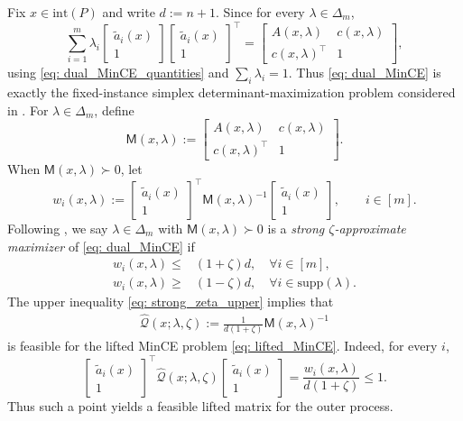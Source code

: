 \documentclass[smallextended]{svjour3}
\newcommand{\wh}{\widehat}
\begin{document}
Fix $x \in \mathrm{int}(P)$ and write $d:=n+1$. Since for every $\lambda\in \Delta_m$,
\[
    \sum_{i=1}^m \lambda_i
    \begin{bmatrix}
        \tilde a_i(x)\\1
    \end{bmatrix}
    \begin{bmatrix}
        \tilde a_i(x)\\1
    \end{bmatrix}^{\top}
    =
    \begin{bmatrix}
        A(x,\lambda) & c(x,\lambda) \\
        c(x,\lambda)^\top & 1
    \end{bmatrix},
\]
using \eqref{eq: dual_MinCE_quantities} and $\sum_i\lambda_i=1$.
Thus \eqref{eq: dual_MinCE} is exactly the fixed-instance simplex
determinant-maximization problem considered in \cite{ahipasaoglu2008fw}. For $\lambda\in \Delta_m$, define
\[
    \mathsf M(x,\lambda):=
    \begin{bmatrix}
        A(x,\lambda) & c(x,\lambda)\\
        c(x,\lambda)^\top & 1
    \end{bmatrix}.
\]
When $\mathsf M(x,\lambda)\succ0$, let
\[
    w_i(x,\lambda):=
    \begin{bmatrix}
        \tilde a_i(x)\\1
    \end{bmatrix}^{\top}
    \mathsf M(x,\lambda)^{-1}
    \begin{bmatrix}
        \tilde a_i(x)\\1
    \end{bmatrix},
    \qquad i\in[m].
\]
Following \cite{ahipasaoglu2008fw}, we say
$\lambda\in\Delta_m$ with $\mathsf M(x,\lambda)\succ0$ is a
\emph{strong $\zeta$-approximate maximizer} of \eqref{eq: dual_MinCE} if
\begin{subequations}
\begin{align}
    w_i(x,\lambda)\leq & (1+\zeta)d,\quad \forall i\in [m], \label{eq: strong_zeta_upper}\\
    w_i(x,\lambda)\geq & (1-\zeta)d,\quad \forall i\in \mathrm{supp}(\lambda). \label{eq: strong_zeta_lower}
\end{align}
\end{subequations}
The upper inequality \eqref{eq: strong_zeta_upper} implies that
\begin{align}\label{eq: waty_recovery}
    \wh{\mathcal{Q}}(x;\lambda,\zeta):=
    \frac{1}{d(1+\zeta)}
    \mathsf M(x,\lambda)^{-1}
\end{align}
is feasible for the lifted MinCE problem \eqref{eq: lifted_MinCE}. Indeed, for every $i$,
\[
    \begin{bmatrix}
        \tilde a_i(x)\\1
    \end{bmatrix}^{\top}
    \wh{\mathcal{Q}}(x;\lambda,\zeta)
    \begin{bmatrix}
        \tilde a_i(x)\\1
    \end{bmatrix}
    = \frac{w_i(x,\lambda)}{d(1+\zeta)}
    \leq 1.
\]
Thus such a point yields a feasible lifted matrix for the outer process.
\end{document}
